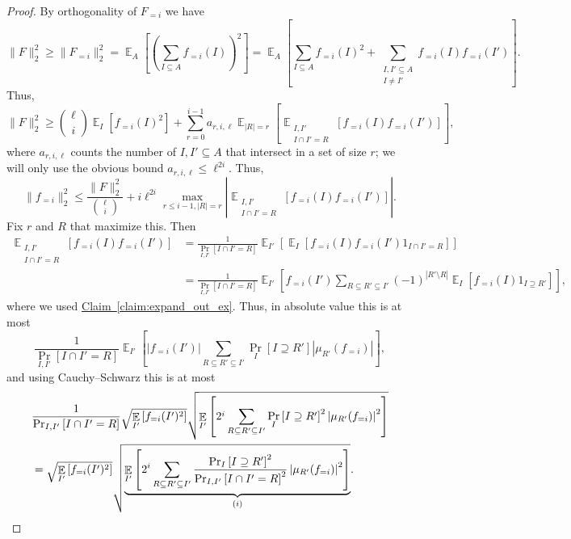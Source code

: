 \documentclass[11pt]{article}
\newcommand{\expref}[2]{\texorpdfstring{\hyperref[#2]{#1~\ref{#2}}}{#1~\ref{#2}}}
\newcommand{\rom}[1]{\uppercase\expandafter{\romannumeral #1\relax}}
\newcommand\card[1]{\left| {#1} \right|}
\newcommand\Prob[2]{{\Pr_{#1}\left[ {#2} \right]}}
\newcommand\Expect[2]{{\mathop{\mathbb{E}}_{#1}\left[ {#2} \right]}}
\newcommand\norm[1]{\| #1 \|}
\renewcommand\geq{\geqslant}
\renewcommand\leq{\leqslant}
\newcommand\lvlfn[2]{{#1}_{={#2}}}
\begin{document}
\begin{proof}
  By orthogonality of $\lvlfn{F}{i}$ we have %
  \[
  \norm{F}_2^2
  \geq \norm{\lvlfn{F}{i}}_2^2
  = \Expect{A}{\left(\sum\limits_{I\subseteq A}{\lvlfn{f}{i}(I)}\right)^2}
  = \Expect{A}{\sum\limits_{I\subseteq A}{\lvlfn{f}{i}(I)^2} + \sum\limits_{\substack{I,I'\subseteq A\\ I\neq I'}}\lvlfn{f}{i}(I)\lvlfn{f}{i}(I')}.
  \]
  Thus,
  \[
  \norm{F}_2^2
  \geq
  \binom{\ell}{i}\Expect{I}{\lvlfn{f}{i}(I)^2}
  +\sum\limits_{r=0}^{i-1}a_{r,i,\ell}
  \Expect{\card{R} = r}{\Expect{\substack{I,I'\\ I\cap I' = R}}{\lvlfn{f}{i}(I)\lvlfn{f}{i}(I')}},
  \]
  where $a_{r,i,\ell}$ counts the number of $I,I'\subseteq A$ that intersect in a set of size $r$; we will only use the obvious
  bound $a_{r,i,\ell}\leq \ell^{2i}$. Thus,
  \begin{equation}\label{eq:mock_parseval}
  \norm{\lvlfn{f}{i}}_2^2
  \leq \frac{\norm{F}_2^2}{\binom{\ell}{i}}
  +i\ell^{2i}\max_{r\leq i-1, \card{R}=r}\card{\Expect{\substack{I,I'\\ I\cap I' = R}}{\lvlfn{f}{i}(I)\lvlfn{f}{i}(I')}}.
  \end{equation}
  Fix $r$ and $R$ that maximize this. Then
  \begin{align*}
  \Expect{\substack{I,I'\\ I\cap I' = R}}{\lvlfn{f}{i}(I)\lvlfn{f}{i}(I')}
  &=\frac{1}{\Prob{I,I'}{I\cap I' = R}}\Expect{I'}{\Expect{I}{\lvlfn{f}{i}(I)\lvlfn{f}{i}(I')1_{I\cap I' = R}}}\\
  &=\frac{1}{\Prob{I,I'}{I\cap I' = R}}\Expect{I'}{\lvlfn{f}{i}(I')\sum\limits_{R\subseteq R'\subseteq I'}(-1)^{\card{R'\setminus R}}\Expect{I}{\lvlfn{f}{i}(I)1_{I \supseteq R'}}},
  \end{align*}
  where we used \expref{Claim}{claim:expand_out_ex}. Thus, in absolute value this is at most
  \[
  \frac{1}{\Prob{I,I'}{I\cap I' = R}}\Expect{I'}{\card{\lvlfn{f}{i}(I')}\sum\limits_{R\subseteq R'\subseteq I'}\Prob{I}{I\supseteq R'}\card{\mu_{R'}(\lvlfn{f}{i})}},
  \]
  and using %
Cauchy--Schwarz   %
this is at most
  \begin{align*}
  &\frac{1}{\Prob{I,I'}{I\cap I' = R}}\sqrt{\Expect{I'}{\lvlfn{f}{i}(I')^2}}
  \sqrt{\Expect{I'}{2^{i}\sum\limits_{R\subseteq R'\subseteq I'}\Prob{I}{I\supseteq R'}^2\card{\mu_{R'}(\lvlfn{f}{i})}^2}}\\
  &=
  \sqrt{\Expect{I'}{\lvlfn{f}{i}(I')^2}}
  \sqrt{\underbrace{\Expect{I'}{2^{i}\sum\limits_{R\subseteq R'\subseteq I'}\frac{\Prob{I}{I\supseteq R'}^2}{\Prob{I,I'}{I\cap I' = R}^2}\card{\mu_{R'}(\lvlfn{f}{i})}^2}}_{(\rom{1})}}.

\end{align*}
\end{proof}
\end{document}
